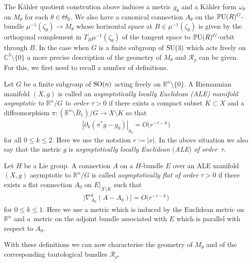 \documentclass[10pt,a4paper]{amsart}
\numberwithin{equation}{section}
\newcommand{\cR}{\mathcal{R}}
\newcommand{\R}{{\mathbb R}}
\newcommand{\C}{{\mathbb C}}
\newcommand{\SO}{{\rm SO}}
\newcommand{\SU}{{\rm SU}}
\newcommand{\PU}{{\mathbb P}{\rm U}}
\newcommand{\del}{\partial}
\begin{document}
The K\"ahler quotient constrution above induces a metric $g_{\theta}$
and a K\"ahler form $\omega_{\theta}$ on $M_{\theta}$ for each $\theta
\in \Theta_\R$.  We also have a canonical connection $A_{\theta}$ on
the $\PU(R)^G$-bundle $\mu^{-1}(\zeta_\theta)\to M_\theta$ whose
horizontal space at $B\in\mu^{-1}(\zeta_\theta)$ is given by the
orthogonal complement in $T_B\mu^{-1}(\zeta_\theta)$ of the
tangent space to $\PU(R)^G$-orbit through $B$.  In the case when $G$
is a f\/inite subgroup of $\SU(3)$ which acts freely on $\C^3{\setminus}
\{0\}$ a more precise description of the geometry of $M_{\theta}$ and
$\cR_{\rho}$ can be given.  For this, we f\/irst need to recall a number
of def\/initions.

\begin{Definition}\label{def:ale}
  Let $G$ be a f\/inite subgroup of $\SO(n)$ acting freely on
  $\R^n{\setminus} \{0\}$.  A Riemannian manifold $(X,g)$ is called an
  \emph{asymptotically locally Euclidean (ALE) manifold asymptotic to
    $\R^n/G$ to order $\tau >0$} if there exists a compact subset $K
  \subset X$ and a dif\/feomorphism $\pi\colon (\R^n {\setminus} \bar
  B_1)/G \to X{\setminus} K$ so that
  \begin{gather*}
    |\del_k (\pi^*g-g_0)|_{g_0}=O\big(r^{-\tau-k}\big)
  \end{gather*}
  for all $0 \leq k \leq 2$.  Here we use the notation $r:=|x|$. In
  the above situation we also say that the metric $g$ is
  \emph{asymptotically locally Euclidean $($ALE$)$ of order~$\tau$}.
\end{Definition}

\begin{Definition}\label{def:afc}
  Let $H$ be a Lie group.  A connection $A$ on a $H$-bundle $E$ over
  an ALE manifold $(X,g)$ asymptotic to $\R^n/G$ is called
  \emph{asymptotically flat of order $\tau >0$} if there exists a f\/lat
  connection $A_0$ on $E|_{X{\setminus} K}$ such that
  \begin{gather*}
    \big|\nabla_{A_0}^k (A-A_0)\big| = O\big(r^{-\tau-k}\big)
  \end{gather*}
  for $0 \leq k \leq 1$.  Here we use a metric which is induced by the
  Euclidean metric on $\R^n$ and a~met\-ric on the adjoint bundle
  associated with $E$ which is parallel with respect to $A_0$.
\end{Definition}

With these def\/initions we can now characterise the geometry of
$M_{\theta}$ and of the corresponding tautological bundles
$\cR_{\rho}$.
\end{document}
